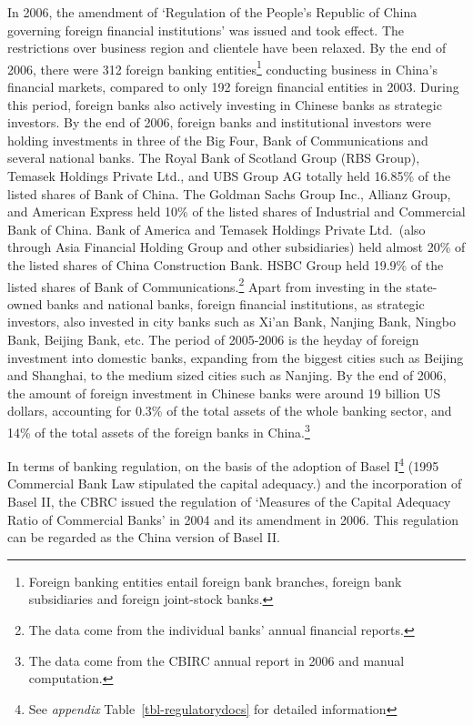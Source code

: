 \documentclass[
  letterpaper,
  DIV=11,
  numbers=noendperiod]{scrreprt}
\begin{document}
In 2006, the amendment of `Regulation of the People's Republic of China
governing foreign financial institutions' was issued and took effect.
The restrictions over business region and clientele have been relaxed.
By the end of 2006, there were 312 foreign banking entities\footnote{Foreign
  banking entities entail foreign bank branches, foreign bank
  subsidiaries and foreign joint-stock banks.} conducting business in
China's financial markets, compared to only 192 foreign financial
entities in 2003. During this period, foreign banks also actively
investing in Chinese banks as strategic investors. By the end of 2006,
foreign banks and institutional investors were holding investments in
three of the Big Four, Bank of Communications and several national
banks. The Royal Bank of Scotland Group (RBS Group), Temasek Holdings
Private Ltd., and UBS Group AG totally held 16.85\% of the listed shares
of Bank of China. The Goldman Sachs Group Inc., Allianz Group, and
American Express held 10\% of the listed shares of Industrial and
Commercial Bank of China. Bank of America and Temasek Holdings Private
Ltd.~(also through Asia Financial Holding Group and other subsidiaries)
held almost 20\% of the listed shares of China Construction Bank. HSBC
Group held 19.9\% of the listed shares of Bank of
Communications.\footnote{The data come from the individual banks' annual
  financial reports.} Apart from investing in the state-owned banks and
national banks, foreign financial institutions, as strategic investors,
also invested in city banks such as Xi'an Bank, Nanjing Bank, Ningbo
Bank, Beijing Bank, etc. The period of 2005-2006 is the heyday of
foreign investment into domestic banks, expanding from the biggest
cities such as Beijing and Shanghai, to the medium sized cities such as
Nanjing. By the end of 2006, the amount of foreign investment in Chinese
banks were around 19 billion US dollars, accounting for 0.3\% of the
total assets of the whole banking sector, and 14\% of the total assets
of the foreign banks in China.\footnote{The data come from the CBIRC
  annual report in 2006 and manual computation.}

In terms of banking regulation, on the basis of the adoption of Basel
I\footnote{See \emph{appendix} Table~\ref{tbl-regulatorydocs} for
  detailed information} (1995 Commercial Bank Law stipulated the capital
adequacy.) and the incorporation of Basel II, the CBRC issued the
regulation of `Measures of the Capital Adequacy Ratio of Commercial
Banks' in 2004 and its amendment in 2006. This regulation can be
regarded as the China version of Basel II.
\end{document}
